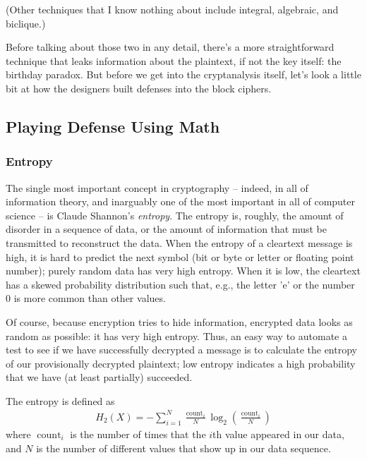 \aono{}
(Other techniques that I know nothing about include integral,
algebraic, and biclique.)

Before talking about those two in any detail, there's a more
straightforward technique that leaks information about the plaintext,
if not the key itself: the birthday paradox.  But before we get into
the cryptanalysis itself, let's look a little bit at how the designers
built defenses into the block ciphers.

\subsection{Playing Defense Using Math}
\label{sec:defense}

\subsubsection{Entropy}

The single most important concept in cryptography -- indeed, in all of
information theory, and inarguably one of the most important in all of
computer science -- is Claude Shannon's \emph{entropy}.  The entropy is,
roughly, the amount of disorder in a sequence of data, or the amount
of information that must be transmitted to reconstruct the data.  When
the entropy of a cleartext message is high, it is hard to predict the
next symbol (bit or byte or letter or floating point number); purely
random data has very high entropy.  When it is low, the cleartext has
a skewed probability distribution such that, e.g., the letter 'e' or
the number 0 is more common than other values.

Of course, because encryption tries to hide information, encrypted
data looks as random as possible: it has very high entropy.  Thus, an
easy way to automate a test to see if we have successfully decrypted a
message is to calculate the entropy of our provisionally decrypted
plaintext; low entropy indicates a high probability that we have (at
least partially) succeeded.

The entropy is defined as
\begin{align}
H_{2}(X)=-\sum_{i=1}^{N} \frac{\operatorname{count}_{i}}{N} \log
_{2}\left(\frac{\operatorname{count}_{i}}{N}\right)
\end{align}
where $\operatorname{count}_i$ is the number of times that the $i$th
value appeared in our data, and $N$ is the number of different values
that show up in our data sequence.

